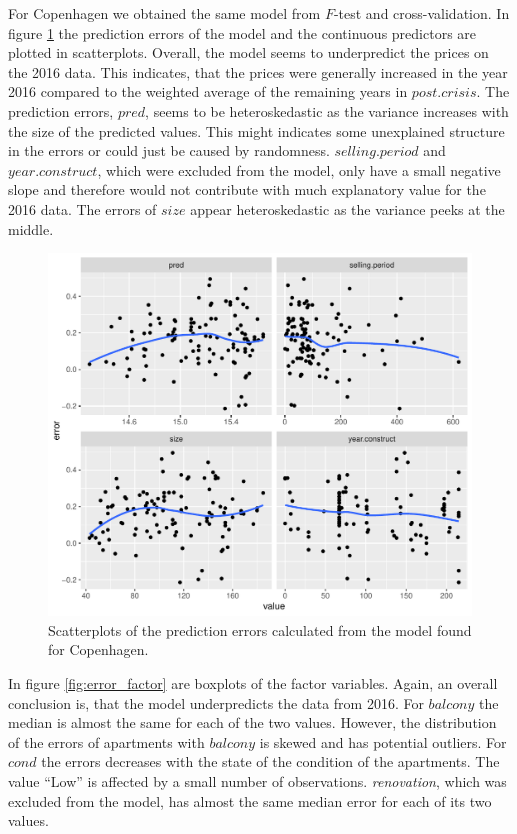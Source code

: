 For Copenhagen we obtained the same model from $F$-test and cross-validation.
In figure \ref{fig:error_cont} the prediction errors of the model and the continuous predictors are plotted in scatterplots. 
Overall, the model seems to underpredict the prices on the 2016 data. 
This indicates, that the prices were generally increased in the year 2016 compared to the weighted average of the remaining years in $post.crisis$. 
The prediction errors, $pred$, seems to be heteroskedastic as the variance increases with the size of the predicted values. 
This might indicates some unexplained structure in the errors or could just be caused by randomness. 
$selling.period$ and $year.construct$, which were excluded from the model, only have a small negative slope and therefore would not contribute with much explanatory value for the 2016 data.
The errors of $size$ appear heteroskedastic as the variance peeks at the middle. 
\begin{figure}[H]
        \centering
      \includegraphics[width = 0.7 \textwidth]{figures/Nanna/errors_continuous.pdf}
      \caption{Scatterplots of the prediction errors calculated from the model found for Copenhagen. }
      \label{fig:error_cont}
\end{figure}
In figure \ref{fig:error_factor} are boxplots of the factor variables. 
Again, an overall conclusion is, that the model underpredicts the data from 2016.
For $balcony$ the median is almost the same for each of the two values.
However, the distribution of the errors of apartments with $balcony$ is skewed and has potential outliers. 
For $cond$ the errors decreases with the state of the condition of the apartments.
The value ``Low'' is affected by a small number of observations. 
\textit{renovation}, which was excluded from the model, has almost the same median error for each of its two values. 
